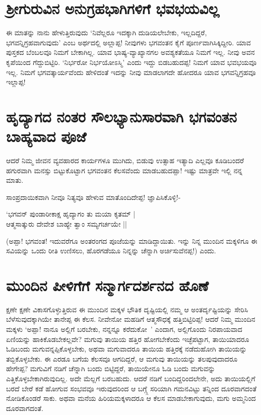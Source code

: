 \section*{ಶ್ರೀಗುರುವಿನ ಅನುಗ್ರಹಭಾಗಿಗಳಿಗೆ ಭವಭಯವಿಲ್ಲ}

ಈ ಮಾತನ್ನು ನಾನು ಹೇಳುತ್ತಿರುವುದು `ನಿವೆಲ್ಲರೂ ಇದಕ್ಕಾಗಿ ದುಡಿಯಲೇಬೇಕು, ಇಲ್ಲದಿದ್ದರೆ, ಭಗವನ್ನಿಗ್ರಹವಾಗುವುದು' ಎಂಬ ಅರ್ಥದಲ್ಲಿ ಅಲ್ಲಾಪ್ಪ! ನೀವುಗಳು ಭಗವಂತನ ಕೈಗೆ ಪೂರ್ಣವಾಗಿಸಿಕ್ಕಿದ್ದೀರಿ. ಯಾವ ಪುಸ್ತಕದ ಬೆಂಬಲವೂ ನಿಮಗೆ ಬೇಕಾಗಿಲ್ಲ. ಯಾವ ಭಾಷ್ಯ-ವ್ಯಾಖ್ಯಾನಗಲ ಅವಶ್ಯಕತೆಯೂ ನಿಮಗೆ ಇಲ್ಲ. ನೀವು ಅವನ ಕೃಪೆಯಿಂದ ಗೆದ್ದುಬಿಟ್ಟಿರಿ. `ನಿರ್ಭರೋ ನಿರ್ಭಯೋಽಸ್ಮಿ'\label{115} ಎಂದು ಇದ್ದು ಬಿಡಬಹುದಪ್ಪ! ನಿಮಗೆ ಯಾವ ಭವಭಯವೂ ಇಲ್ಲ. ನಿಮಗೆ ಭಗವತ್ಕಾರ್ಯವೆಂದು ಹೇಳಿದಂತೆ ಇದನ್ನು ನೀವು ಮಾಡಲಾಗದೇ ಹೋದರೂ ಯಾವ ಭಗವನ್ನಿಗ್ರಹವೂ ಇಲ್ಲಾಪ್ಪ!

\section*{ಹೃದ್ಯಾಗದ ನಂತರ ಸೌಲಭ್ಯಾನುಸಾರವಾಗಿ ಭಗವಂತನ ಬಾಹ್ಯವಾದ ಪೂಜೆ}

ಆದರೆ ನಿಮ್ಮ ಜೀವನ ವ್ಯವಹಾರದ ಕಾರ್ಯಗಳೂ ಮುಗಿದು, ಬಿಡುವು ಉತ್ಸಾಹ ಇತ್ಯಾದಿ ಎಲ್ಲವೂ ಕೂಡಿಬಂದರೆ ಹಗುರವಾಗಿ ಮನಸ್ಸು ಬಿಟ್ಟುಕೊಟ್ಟಾಗ ಭಗವಂತನ ಕೆಲಸವೆಂದು ಮಾಡಬಹುದಪ್ಪಾ! ಇಷ್ಟು ಮಾತ್ರವೇ ಇಲ್ಲಿ ನನ್ನ ಮಾತು.

ಸಾಂಪ್ರದಾಯಿಕವಾಗಿ ನೀವೂ ನಿತ್ಯವೂ ಹೇಳುವ ಮಾತೊಂದಿದೇಪ್ಪ! ಜ್ಞಾಪಿಸಿಕೊಳ್ಳಿ!-

\begin{shloka}
`ಭಗವನ್ ಪುಂಡಾರೀಕಾಕ್ಷ ಹೃದ್ಯಾಗಂ ತು ಮಯಾ ಕೃತಮ್ |\label{115a}\\
ಆತ್ಮಸಾತ್ಕುರು ದೇವೇಶ ಬಾಹ್ಯೇ ತ್ವಾಂ ಸಮ್ಯಗರ್ಚಯೇ ||
\end{shloka}

(ಅಪ್ಪಾ! ಭಗವಂತ! ಇದುವರೆಗೂ ಅಂತರಂಗದ ಪೂಜೆಯನ್ನು ಮಾಡಿದ್ದಾಯಿತು. ಇನ್ನು ನಿನ್ನ ಮುಂದಿನ ಮಕ್ಕಳಿಗೂ ಈ ಸವಿಯನ್ನು ಒಂದು ರೀತಿ ಉಣಿಸಲು, ಹೊರಗಡೆಯೂ ನಿನ್ನನ್ನು ಚೆನ್ನಾಗಿ ಅರ್ಚಿಸುವೆನಪ್ಪ!) ಎಂದು.

\section*{ಮುಂದಿನ ಪೀಳಿಗೆಗೆ ಸನ್ಮಾರ್ಗದರ್ಶನದ ಹೊಣೆ}

ಕ್ಷಣೇ ಕ್ಷಣೇ ವಿಕಾಸಗೊಳ್ಳುತ್ತಿರುವ ಈ ಮುಂದಿನ ಮಕ್ಕಳ ಭೌತಿಕ ದೃಷ್ಟಿಯಲ್ಲಿ ನಮ್ಮ ಆ ಅಂತರ್ದೃಷ್ಟಿಯನ್ನು ಸೇರಿಸಿ ಬೆಳೆಸುವುದಕ್ಕಾಗಿಯೇ ತಾನೇಪ್ಪ ಈ ಕೆಲಸ. ನೀವೇನೋ ಮಹಡಿಗೆ ಆತ್ಮಸೌಧಕ್ಕೆ ಹತ್ತಿಬಿಟ್ಟಿರಿಪ್ಪ! ಆದರೆ ನಿಮ್ಮ ಮುಂದಿನ ಮಕ್ಕಳು `ಅಪ್ಪಾ! ನಾನೂ ಅಲ್ಲಿಗೆ ಬರಬೇಕು, ನನ್ನನ್ನೂ ಕರೆದುಕೋ~' ಎಂದಾಗ, ಅಲ್ಲಿಗೊಂದು ನಿರಪಾಯವಾದ ಏಣಿಯನ್ನು ಹಾಕಿಕೊಡಬೇಕಲ್ಲವೇ? ಮಗುವು ತಾಯಿಯ ಹತ್ತಿರ ಹೋಗಬೇಕೆಂದು ಇಚ್ಛೆಪಟ್ಟಾಗ, ತಾಯಿಯಾದರೂ ಓಡಿಬಂದು ಮಗುವನ್ನಪ್ಪಿಕೊಳ್ಳಬೇಕು, ಅಥವಾ ಮಗುವಾದರೂ ತಾಯಿಯ ಹತ್ತಿರಕ್ಕೆ ನಡೆದುಹೋಗಿ ತಾಯಿಯನ್ನು ತಬ್ಬಿಕೊಳ್ಳಬೇಕು. ಈ ಎರಡೂ ಬಗೆಯ ಕೆಲಸವೂ ಆಗದಿದ್ದರೆ, ಆ ಮಗುವು ತಾಯಿಯನ್ನು ತಲಪುವುದಾದರೂ ಹೇಗೇಪ್ಪ? ಮಗುವಿಗೆ ನಡಿಗೆ ಚೆನ್ನಾಗಿ ಬಂದು ಬಿಟ್ಟಿದ್ದರೆ, ತಾಯಿಯೇನೂ ಓಡಿ ಬಂದು ಮಗುವನ್ನು ಎತ್ತಿಕೊಳ್ಳಬೇಕಾಗಿರುವುದಿಲ್ಲ. ಅದೇ ಮೆಲ್ಲಗೆ ಬರಬಹುದು. ಆದರೆ ನಡಿಗೆ ಬಂದಿದ್ದರಿಂದಲೇನೇ, ಅದು ತಾಯಿಯಲ್ಲಿಗೆ ಬರದೆ ಬೇರೆ ಕಡೆ ಹೋಗುವ ಸಂಭವವೂ ಇರುವುದರಿಂದ ಆ ಬಗ್ಗ್ಗೆ ಸರಿಯಾಗಿ ಗಮನವಿಟ್ಟು ತನ್ನಿಂದ ದೂರವಾಗದಂತೆ ನೋಡಿಕೊಂಡರೆ ಸಾಕು. ಅಥವಾ ಮನೆಯ ಹಿರಿಯಮಕ್ಕಳಾದರೂ ಆ ಕೆಲಸ ಮಾಡಬೇಕಾಗುವುದು, ಮಗು ಅಮ್ಮನಿಂದ ದೂರವಾಗದಂತೆ.


